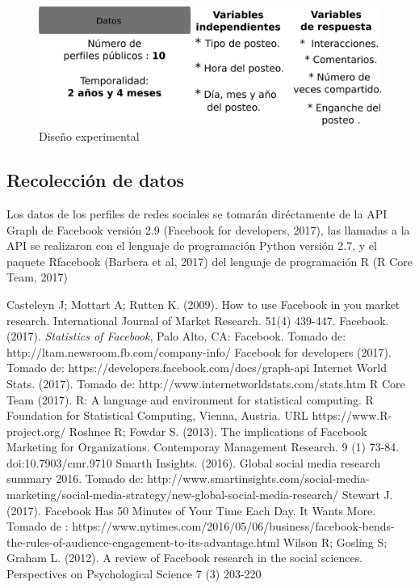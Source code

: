\documentclass[a4paper,10pt]{article}
\begin{document}
\begin{figure}[H]
  \begin{center}
   \includegraphics[width=.75\textwidth]{imagenes/figura1.png}
   \caption{Diseño experimental}
  \end{center} 
\end{figure}

\subsection{Recolección de datos}
Los datos de los perfiles de redes sociales se tomarán diréctamente de la API Graph de Facebook 
versión 2.9 (Facebook for developers, 2017), las llamadas a la API se realizaron con el lenguaje de programación Python versión 2.7, 
y el paquete Rfacebook (Barbera et al, 2017) del lenguaje de programación R (R Core Team, 2017)




\begin{thebibliography}{20}
   Casteleyn J; Mottart A; Rutten K. (2009). How to use Facebook in you market research. International Journal of Market Research. 51(4) 439-447.
   Facebook. (2017). \textit{ Statistics of  Facebook}, Palo  Alto,  CA:  Facebook. Tomado de: http://ltam.newsroom.fb.com/company-info/
   Facebook for developers (2017). Tomado de: https://developers.facebook.com/docs/graph-api
   Internet World Stats. (2017). Tomado de: http://www.internetworldstats.com/stats.htm
   R Core Team (2017). R: A language and environment for statistical computing. R Foundation for Statistical Computing, Vienna, Austria. URL https://www.R-project.org/
   Roshnee R; Fowdar S. (2013). The implications of Facebook Marketing for Organizations. Contemporay Management Research. 9 (1) 73-84. doi:10.7903/cmr.9710 
   Smarth Insights. (2016). Global social media research summary 2016. Tomado de: http://www.smartinsights.com/social-media-marketing/social-media-strategy/new-global-social-media-research/
   Stewart J. (2017). Facebook Has 50 Minutes of Your Time Each Day. It Wants More. Tomado de : https://www.nytimes.com/2016/05/06/business/facebook-bends-the-rules-of-audience-engagement-to-its-advantage.html
  Wilson R; Gosling S; Graham L. (2012). A review of Facebook research in the social sciences. Perspectives on Psychological Science 7 (3) 203-220
\end{thebibliography}
\end{document}

